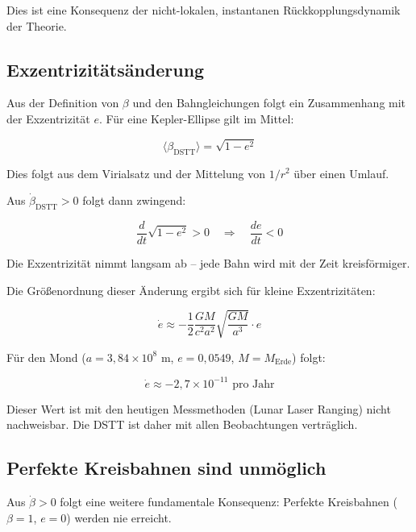 \documentclass[12pt,a4paper]{article}
\begin{document}
Dies ist eine Konsequenz der nicht-lokalen, instantanen Rückkopplungsdynamik der Theorie.

\subsection{Exzentrizitätsänderung}

Aus der Definition von $\beta$ und den Bahngleichungen folgt ein Zusammenhang mit der Exzentrizität $e$. Für eine Kepler-Ellipse gilt im Mittel:

\begin{equation}
\langle \beta_{\text{DSTT}} \rangle = \sqrt{1 - e^2}
\end{equation}

Dies folgt aus dem Virialsatz und der Mittelung von $1/r^2$ über einen Umlauf.

Aus $\dot{\beta}_{\text{DSTT}} > 0$ folgt dann zwingend:

\begin{equation}
\frac{d}{dt} \sqrt{1 - e^2} > 0 \quad \Rightarrow \quad \frac{de}{dt} < 0
\end{equation}

Die Exzentrizität nimmt langsam ab -- jede Bahn wird mit der Zeit kreisförmiger.

Die Größenordnung dieser Änderung ergibt sich für kleine Exzentrizitäten:

\begin{equation}
\dot{e} \approx -\frac{1}{2} \frac{GM}{c^2 a^2} \sqrt{\frac{GM}{a^3}} \cdot e
\end{equation}

Für den Mond ($a = 3,84 \times 10^8$ m, $e = 0,0549$, $M = M_{\text{Erde}}$) folgt:

\begin{equation}
\dot{e} \approx -2,7 \times 10^{-11} \text{ pro Jahr}
\end{equation}

Dieser Wert ist mit den heutigen Messmethoden (Lunar Laser Ranging) nicht nachweisbar. Die DSTT ist daher mit allen Beobachtungen verträglich.

\subsection{Perfekte Kreisbahnen sind unmöglich}

Aus $\dot{\beta} > 0$ folgt eine weitere fundamentale Konsequenz: Perfekte Kreisbahnen ($\beta = 1$, $e = 0$) werden nie erreicht.
\end{document}
